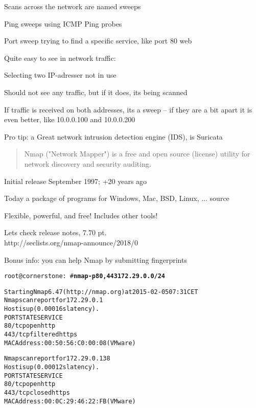 \documentclass[Screen16to9,17pt]{foils}
\begin{document}

\begin{list1}
\item Scans across the network are named sweeps
\item Ping sweeps using ICMP Ping probes
\item Port sweep trying to find a specific service, like port 80 web
\item Quite easy to see in network traffic:
\begin{list2}
\item Selecting two IP-adresser not in use
\item Should not see any traffic, but if it does, its being scanned
\item If traffic is received on both addresses, its a sweep -- if they are a bit apart it is even better, like 10.0.0.100 and 10.0.0.200
  \end{list2}

\vskip 2cm
Pro tip: a Great network intrusion detection engine (IDS), is Suricata 
\end{list1}

\begin{quote}
Nmap ("Network Mapper") is a free and open source (license) utility for network discovery and security auditing.
\end{quote}

\begin{list1}
\item Initial release September 1997; +20 years ago
\item Today a package of programs for Windows, Mac, BSD, Linux, ... source
\item Flexible, powerful, and free! Includes other tools!
\item Lets check release notes, 7.70 pt.\\
http://seclists.org/nmap-announce/2018/0
\end{list1}

Bonus info: you can help Nmap by submitting fingerprints



\begin{alltt}\small
root@cornerstone:~#{\bfseries  nmap -p80,443 172.29.0.0/24}

Starting Nmap 6.47 ( http://nmap.org ) at 2015-02-05 07:31 CET
Nmap scan report for 172.29.0.1
Host is up (0.00016s latency).
PORT    STATE    SERVICE
{\color{darkgreen}80/tcp  open     http}
443/tcp filtered https
MAC Address: 00:50:56:C0:00:08 (VMware)

Nmap scan report for 172.29.0.138
Host is up (0.00012s latency).
PORT    STATE  SERVICE
{\color{darkgreen}80/tcp  open   http}
443/tcp closed https
MAC Address: 00:0C:29:46:22:FB (VMware)

\end{alltt}
\end{document}
